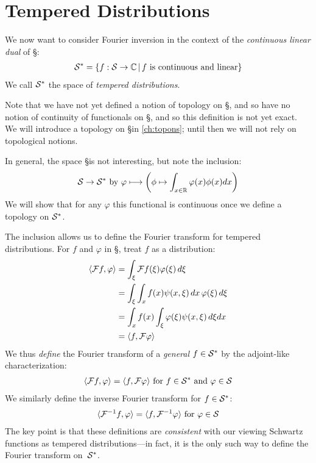     \section{Tempered Distributions}
      We now want to consider Fourier inversion in the context of the \emph{continuous linear dual} of \S:
      \begin{align*}
        \S^* = \{f:\S\rightarrow\C\,\vert\,f\text{ is continuous and linear}\}
      \end{align*}
      We call $\S^*$ the space of \emph{tempered distributions}.

      Note that we have not yet defined a notion of topology on \S, and so have no notion of continuity of functionals on \S, and so this definition is not yet exact.
      We will introduce a topology on \S in \autoref{ch:topons}; until then we will not rely on topological notions.

      In general, the space \S is not interesting, but note the inclusion:
      \begin{align*}
        \S\rightarrow\S^*\text{ by }\varphi \longmapsto\left(\phi\mapsto\int_{x\in\R}\varphi(x)\phi(x)dx\right)
      \end{align*}
      We will show that for any $\varphi$ this functional is continuous once we define a topology on $\S^*$. 
      
      The inclusion allows us to define the Fourier transform for tempered distributions.
      For $f$ and $\varphi$ in \S, treat $f$ as a distribution:
      \begin{align*}
        \langle\F f,\varphi\rangle &= \int_\xi\F f(\xi)\varphi(\xi)\,d\xi\\
        &= \int_\xi\int_xf(x)\psi(x,\xi)\,dx\,\varphi(\xi)\,d\xi\\
        &= \int_xf(x)\int_\xi\varphi(\xi)\psi(x,\xi)\,d\xi dx\\
        &= \langle f,\F\varphi\rangle
      \end{align*}
      We thus \emph{define} the Fourier transform of a \emph{general} $f\in\S^*$ by the adjoint-like characterization:
      \begin{align*}
        \langle\F f,\varphi\rangle = \langle f,\F\varphi\rangle \text{ for }f\in\S^*\text{ and }\varphi\in\S
      \end{align*}
      We similarly define the inverse Fourier transform for $f\in\S^*$:
      \begin{align*}
        \langle\F^{-1}f,\varphi\rangle = \langle f,\F^{-1}\varphi\rangle\text{ for }\varphi\in\S
      \end{align*}
      The key point is that these definitions are \emph{consistent} with our viewing Schwartz functions as tempered distributions---in fact, it is the only such way to define the Fourier transform on~$\S^*$.

